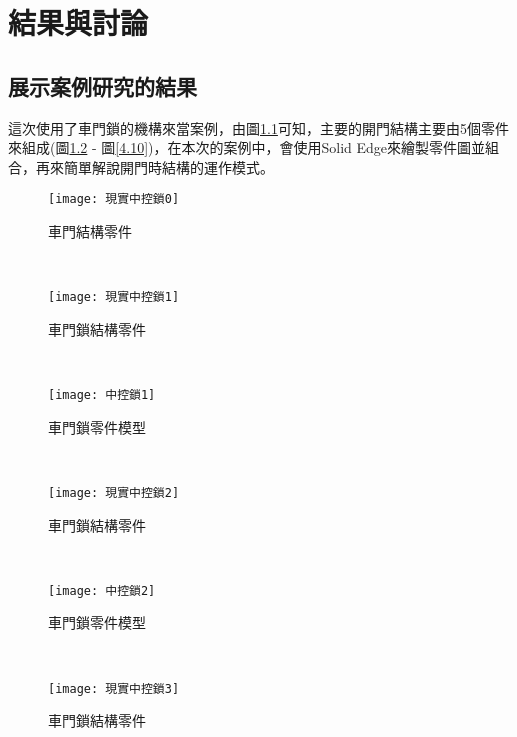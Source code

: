 \chapter{結果與討論}
\section{展示案例研究的結果}

這次使用了車門鎖的機構來當案例，由圖\ref{4.0}可知，主要的開門結構主要由5個零件來組成(圖\ref{4.1} - 圖\ref{4.10})，在本次的案例中，會使用Solid Edge來繪製零件圖並組合，再來簡單解說開門時結構的運作模式。\\
\begin{figure}[hbt!]
\begin{center}
\texttt{[image: 現實中控鎖0]}
\caption{\Large 車門結構零件}\label{4.0}
\end{center}
\end{figure}
\\
\begin{figure}[hbt!]
\begin{center}
\texttt{[image: 現實中控鎖1]}
\caption{\Large 車門鎖結構零件}\label{4.1}
\end{center}
\end{figure}
\\
\begin{figure}[hbt!]
\begin{center}
\texttt{[image: 中控鎖1]}
\caption{\Large 車門鎖零件模型}\label{4.6}
\end{center}
\end{figure}
\\
\begin{figure}[hbt!]
\begin{center}
\texttt{[image: 現實中控鎖2]}
\caption{\Large 車門鎖結構零件}\label{4.2}
\end{center}
\end{figure}
\\
\begin{figure}[hbt!]
\begin{center}
\texttt{[image: 中控鎖2]}
\caption{\Large 車門鎖零件模型}\label{4.7}
\end{center}
\end{figure}
\\
\begin{figure}[hbt!]
\begin{center}
\texttt{[image: 現實中控鎖3]}
\caption{\Large 車門鎖結構零件}\label{4.3}
\end{center}
\end{figure}
